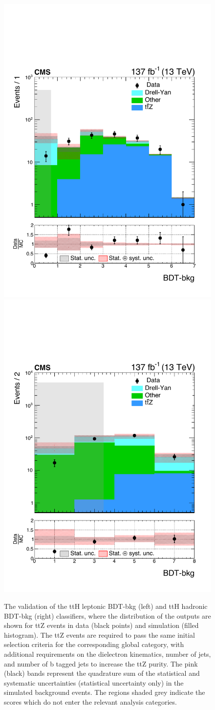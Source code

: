 \begin{figure}[htb!]
  \centering
  \includegraphics[width=.49\textwidth]{Figures/hgg_overview/ttHLeptonic_MVA_ttZ.pdf}
  \includegraphics[width=.49\textwidth]{Figures/hgg_overview/ttHHadronic_MVA_ttZ.pdf}
  \caption[Validation of the top-associated classifiers]
  {
    The validation of the ttH leptonic BDT-bkg (left) and ttH hadronic BDT-bkg (right) classifiers, where the distribution of the outputs are shown for ttZ events in data (black points) and simulation (filled histogram). The ttZ events are required to pass the same initial selection criteria for the corresponding global category, with additional requirements on the dielectron kinematics, number of jets, and number of b tagged jets to increase the ttZ purity. The pink (black) bands represent the quadrature sum of the statistical and systematic uncertainties (statistical uncertainty only) in the simulated background events. The regions shaded grey indicate the scores which do not enter the relevant analysis categories.
  }
  \label{fig:top_validation}
\end{figure}

